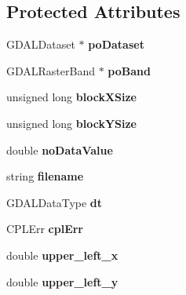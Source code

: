 \subsection*{Protected Attributes}
\begin{DoxyCompactItemize}
\item 
G\+D\+A\+L\+Dataset $\ast$ {\bfseries po\+Dataset}\hypertarget{class_map_ab25f4ed0c6612065dbda19cc1db10b75}{}\label{class_map_ab25f4ed0c6612065dbda19cc1db10b75}

\item 
G\+D\+A\+L\+Raster\+Band $\ast$ {\bfseries po\+Band}\hypertarget{class_map_ac6cbdae357af04320bb5d90aee486e33}{}\label{class_map_ac6cbdae357af04320bb5d90aee486e33}

\item 
unsigned long {\bfseries block\+X\+Size}\hypertarget{class_map_a929de1f15110afceeec89b47da506e67}{}\label{class_map_a929de1f15110afceeec89b47da506e67}

\item 
unsigned long {\bfseries block\+Y\+Size}\hypertarget{class_map_ab02c8f5022c1835c135f202fe9b2eebd}{}\label{class_map_ab02c8f5022c1835c135f202fe9b2eebd}

\item 
double {\bfseries no\+Data\+Value}\hypertarget{class_map_ac7c12737fe97556a4d03487716fa4f45}{}\label{class_map_ac7c12737fe97556a4d03487716fa4f45}

\item 
string {\bfseries filename}\hypertarget{class_map_a193db5e3339832c878c37336d39122e0}{}\label{class_map_a193db5e3339832c878c37336d39122e0}

\item 
G\+D\+A\+L\+Data\+Type {\bfseries dt}\hypertarget{class_map_a3dc928c65262f0c8f20f0f64e6cde40f}{}\label{class_map_a3dc928c65262f0c8f20f0f64e6cde40f}

\item 
C\+P\+L\+Err {\bfseries cpl\+Err}\hypertarget{class_map_a388da4db48d63ab579b600294a600c9d}{}\label{class_map_a388da4db48d63ab579b600294a600c9d}

\item 
double {\bfseries upper\+\_\+left\+\_\+x}\hypertarget{class_map_ae3b72e22a19277aa531ae90f47c461b2}{}\label{class_map_ae3b72e22a19277aa531ae90f47c461b2}

\item 
double {\bfseries upper\+\_\+left\+\_\+y}\hypertarget{class_map_a37d531f2f186f90d3f4563e91f2623cb}{}\label{class_map_a37d531f2f186f90d3f4563e91f2623cb}


\end{DoxyCompactItemize}
